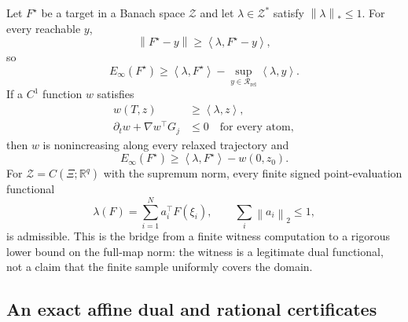 \documentclass[twoside,11pt]{article}
\newcommand{\Z}{\mathcal{Z}}
\newcommand{\Rel}{\mathrm{rel}}
\newcommand{\norm}[1]{\left\lVert #1\right\rVert}
\newcommand{\inner}[2]{\left\langle #1,#2\right\rangle}
\newcommand{\RR}{\mathscr{R}}
\begin{document}
Let $F^\star$ be a target in a Banach space $\Z$ and let $\lambda\in\Z^*$ satisfy $\norm{\lambda}_*\le1$.  For every reachable $y$,
\begin{equation}
 \norm{F^\star-y}\ge\inner{\lambda}{F^\star-y},
 \label{eq:dual-norm-main}
\end{equation}
so
\begin{equation}
 E_\infty(F^\star)
 \ge\inner{\lambda}{F^\star}
 -\sup_{y\in\RR_{\Rel}}\inner{\lambda}{y}.
 \label{eq:support-basic-main}
\end{equation}
If a $C^1$ function $w$ satisfies
\begin{align}
 w(T,z)&\ge\inner{\lambda}{z},
 \label{eq:support-terminal-main}\\
 \partial_tw+\nabla w^\top G_j&\le0
 \quad\text{for every atom},
 \label{eq:support-hjb-main}
\end{align}
then $w$ is nonincreasing along every relaxed trajectory and
\begin{equation}
 E_\infty(F^\star)
 \ge\inner{\lambda}{F^\star}-w(0,z_0).
 \label{eq:support-certified-main}
\end{equation}
For $\Z=C(\Xi;\mathbb R^q)$ with the supremum norm, every finite signed point-evaluation functional
\begin{equation}
 \lambda(F)=\sum_{i=1}^Na_i^\top F(\xi_i),
 \qquad
 \sum_i\norm{a_i}_2\le1,
 \label{eq:finite-point-witness-main}
\end{equation}
is admissible.  This is the bridge from a finite witness computation to a rigorous lower bound on the full-map norm: the witness is a legitimate dual functional, not a claim that the finite sample uniformly covers the domain.

\subsection{An exact affine dual and rational certificates}
\label{sec:affine-certificate-main}
\end{document}
